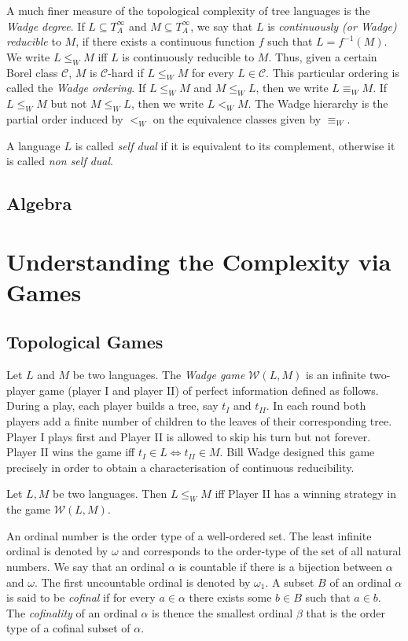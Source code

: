 \documentclass{llncs}
\begin{document}
A much finer measure of the topological complexity of tree languages is the \emph{Wadge degree}.
If $L \subseteq T^\infty_A$ and $M\subseteq T^\infty_A$,   we say that $L$ is \emph{continuously (or Wadge)
reducible} to $M$, if there exists a continuous function $f$ such that $L=
f^{-1}(M)$. We write $L \leq_W M$ iff $L$ is continuously reducible to $M$.
Thus, given a certain Borel class $\mathcal{C}$, $M$ is $\mathcal{C}$-hard if $L
\leq_W M$ for every $L \in \mathcal{C}$.  This particular ordering is called the
{\em Wadge ordering}. If $L \leq_W M$ and $M \leq_W L$, then we write $L
\equiv_W M$. If $L \leq_W M$ but not $M \leq_W L$, then we write $L<_W
M$. The Wadge hierarchy is the partial order induced by $<_W$ on the
equivalence classes given by $\equiv_W$.

A language  $L$ is called {\em self dual} if it is equivalent to its complement, otherwise it is called {\em non self dual}.

\subsection{Algebra}

\section{Understanding the Complexity via Games}

\subsection{Topological Games}
Let $L$ and $M$ be two languages. The {\em Wadge game}
$\mathcal{W}(L, M)$ is an infinite two-player game (player I and player II) of perfect information defined as follows. During a play,
each player builds a tree, say $t_{I}$ and $t_{II}$. 
In each round both players add a finite number of children to the leaves
of their corresponding tree. Player I plays first and Player II is allowed to
skip his turn but not forever.  Player II wins the game iff $t_{I} \in L
\Leftrightarrow t_{II} \in M$.  Bill Wadge designed this game precisely in order
to obtain a characterisation of continuous reducibility.
\begin{lemma}
Let $L, M$ be two languages. Then  $L \leq_W M$ iff Player II has a winning strategy in the game $\mathcal{W}(L, M)$.
\end{lemma}

An ordinal number is the order type of a well-ordered set. 
The least infinite ordinal is denoted by $\omega$ and corresponds to the order-type of the set of all natural numbers. We say that an ordinal $\alpha$ is countable if there is a bijection between $\alpha$ and $\omega$. The first uncountable ordinal is denoted by $\omega_1$.
A subset $B$ of an ordinal $\alpha$ is said to be \emph{cofinal} if 
for every $a \in \alpha$ there exists some $b \in B$ such that $a \in b$.
The \emph{cofinality} of an ordinal $\alpha$ is thence the smallest ordinal $\beta$ that is the order type of a cofinal subset of $\alpha$.
\end{document}
